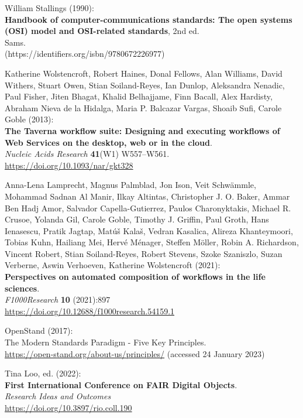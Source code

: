 \begin{thebibliography}{9}
William Stallings (1990): \\
\textbf{Handbook of computer-communications standards: {The} open systems ({OSI}) model and {OSI-related}
standards}, 2nd ed. \\
Sams.\\
[ISBN 978-0-672-22697-7](https://identifiers.org/isbn/9780672226977)

Katherine Wolstencroft, Robert Haines, Donal Fellows, Alan Williams,
David Withers, Stuart Owen, Stian Soiland-Reyes, Ian Dunlop, Aleksandra
Nenadic, Paul Fisher, Jiten Bhagat, Khalid Belhajjame, Finn Bacall, Alex
Hardisty, Abraham Nieva de la Hidalga, Maria P. Balcazar Vargas, Shoaib
Sufi, Carole Goble (2013): \\
\textbf{The {Taverna} workflow suite: Designing
and executing workflows of {Web Services} on the desktop, web or in the
cloud}. \\
\emph{Nucleic Acids Research} \textbf{41}(W1) W557--W561.\\
\url{https://doi.org/10.1093/nar/gkt328}

Anna-Lena Lamprecht, Magnus Palmblad, Jon Ison, Veit Schwämmle, Mohammad
Sadnan Al Manir, Ilkay Altintas, Christopher J. O. Baker, Ammar Ben Hadj
Amor, Salvador Capella-Gutierrez, Paulos Charonyktakis, Michael R.
Crusoe, Yolanda Gil, Carole Goble, Timothy J. Griffin, Paul Groth, Hans
Ienasescu, Pratik Jagtap, Matúš Kalaš, Vedran Kasalica, Alireza
Khanteymoori, Tobias Kuhn, Hailiang Mei, Hervé Ménager, Steffen Möller,
Robin A. Richardson, Vincent Robert, Stian Soiland-Reyes, Robert
Stevens, Szoke Szaniszlo, Suzan Verberne, Aswin Verhoeven, Katherine
Wolstencroft (2021): \\
\textbf{Perspectives on automated composition of workflows
in the life sciences}. \\
\emph{F1000Research} \textbf{10} (2021):897 \\
\url{https://doi.org/10.12688/f1000research.54159.1}

OpenStand (2017): \\
The {Modern Standards Paradigm} - {Five Key Principles}.\\
\url{https://open-stand.org/about-us/principles/} (accessed 24 January
2023)

Tina Loo, ed. (2022): \\
\textbf{First International Conference on FAIR Digital Objects}.\\
\emph{Research Ideas and Outcomes}\\
\url{https://doi.org/10.3897/rio.coll.190}


\end{thebibliography}
